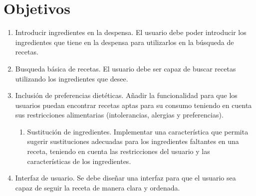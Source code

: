 \section{Objetivos}
\begin{enumerate}
    \item Introducir ingredientes en la despensa. El usuario debe poder introducir los ingredientes que tiene en la despensa para utilizarlos en la búsqueda de recetas. 
    \item Busqueda básica de recetas. El usuario debe ser capaz de buscar recetas utilizando los ingredientes que desee.
    \item Inclusión de preferencias dietéticas. Añadir la funcionalidad para que los usuarios puedan encontrar recetas aptas para su consumo teniendo en cuenta sus restricciones alimentarias (intolerancias, alergias y preferencias).
    \begin{enumerate}
        \item Sustitución de ingredientes. Implementar una característica que permita sugerir sustituciones adecuadas para los ingredientes faltantes en una receta, teniendo en cuenta las restricciones del usuario y las características de los ingredientes.
    \end{enumerate}
    \item Interfaz de usuario. Se debe diseñar una interfaz para que el usuario sea capaz de seguir la receta de manera clara y ordenada. 
\end{enumerate}
